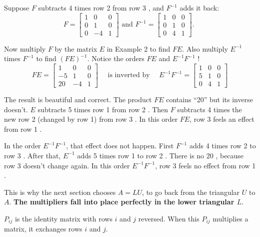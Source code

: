 \begin{example}
    Suppose $ F $ subtracts 4 times row 2 from row 3 , and $ F^{-1} $ adds it back:
$$
F=\left[\begin{array}{rrr}
1 & 0 & 0 \\
0 & 1 & 0 \\
0 & -4 & 1
\end{array}\right] \text { and } F^{-1}=\left[\begin{array}{lll}
1 & 0 & 0 \\
0 & 1 & 0 \\
0 & 4 & 1
\end{array}\right] \text {. }
$$

Now multiply $ F $ by the matrix $ E $ in Example 2 to find $ F E $. Also multiply $ E^{-1} $ times $ F^{-1} $ to find $ (F E)^{-1} $. Notice the orders $ F E $ and $ E^{-1} F^{-1} $ !
$$
F E=\left[\begin{array}{rrr}
1 & 0 & 0 \\
-5 & 1 & 0 \\
20 & -4 & 1
\end{array}\right] \quad \text { is inverted by } \quad E^{-1} F^{-1}=\left[\begin{array}{ccc}
1 & 0 & 0 \\
5 & 1 & 0 \\
0 & 4 & 1
\end{array}\right]
$$


\end{example}

The result is beautiful and correct. The product $ F E $ contains  ``20'' but its inverse doesn't. $ E $ subtracts 5 times row 1 from row 2 . Then $ F $ subtracts 4 times the new row 2 (changed by row 1) from row 3 . In this order $ F E $, row 3 feels an effect from row 1 .

In the order $ E^{-1} F^{-1} $, that effect does not happen. First $ F^{-1} $ adds 4 times row 2 to row 3 . After that, $ E^{-1} $ adds 5 times row 1 to row 2 . There is no 20 , because row 3 doesn't change again. In this order $ E^{-1} F^{-1} $, row 3 feels no effect from row 1 .

This is why the next section chooses $ A=L U $, to go back from the triangular $ U $ to $ A $. \textbf{The multipliers fall into place perfectly in the lower triangular $ L $}.

\begin{definition}
    $  P_{i j} $ is the identity matrix with rows $ i $ and $ j $ reversed. When this  $ P_{i j} $ multiplies a matrix, it exchanges rows $ i $ and $ j $.
\end{definition}


